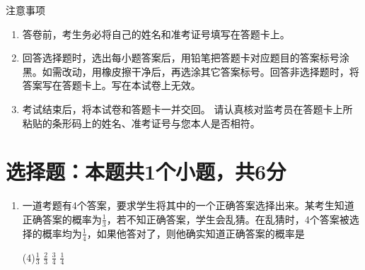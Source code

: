 \documentclass[12pt,twoside,space]{ctexart}
\begin{document}
\juemi
{}
{\heiti 注意事项}
\begin{enumerate}[itemsep=-0.3em,topsep=0pt]
\item 答卷前，考生务必将自己的姓名和准考证号填写在答题卡上。
\item 回答选择题时，选出每小题答案后，用铅笔把答题卡对应题目的答案标号涂黑。如需改动，用橡皮擦干净后，再选涂其它答案标号。回答非选择题时，将答案写在答题卡上。写在本试卷上无效。
\item 考试结束后，将本试卷和答题卡一并交回。
	请认真核对监考员在答题卡上所粘贴的条形码上的姓名、准考证号与您本人是否相符。
\end{enumerate}
\section{选择题：本题共1个小题，共6分}
\begin{enumerate}[itemsep=0.2em,topsep=0pt]
\item
一道考题有4个答案，要求学生将其中的一个正确答案选择出来。某考生知道正确答案的概率为$\frac{1}{3}$，若不知正确答案，学生会乱猜。在乱猜时，4个答案被选择的概率均为$\frac{1}{4}$，如果他答对了，则他确实知道正确答案的概率是
\begin{tasks}(4)\task $\frac{1}{3}$ \task $\frac{2}{3}$ \task $\frac{3}{4}$ \task $\frac{1}{4}$ 
\end{tasks}
\end{enumerate}

\clearpage
\end{document}
